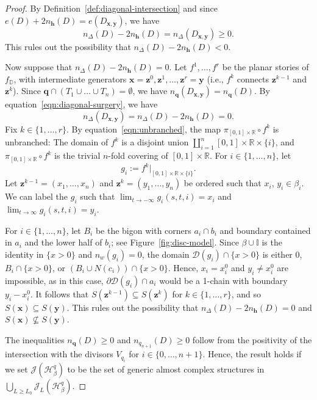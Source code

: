 \documentclass[11pt]{amsart}
\numberwithin{equation}{section}
\numberwithin{figure}{section}
\theoremstyle{definition}
\newcommand{\cD}{\mathcal{D}}
\newcommand{\cH}{\mathcal{H}}
\newcommand{\cJ}{\mathscr{J}}
\newcommand{\bD}{\mathbb{D}}
\newcommand{\bI}{\mathbb{I}}
\newcommand{\bR}{\mathbb{R}}
\newcommand{\hs}{\boldsymbol{h}}
\newcommand{\qs}{\boldsymbol{q}}
\newcommand{\xs}{\boldsymbol{x}}
\newcommand{\ys}{\boldsymbol{y}}
\newcommand{\zs}{\boldsymbol{z}}
\begin{document}
\begin{proof}
    By Definition~\ref{def:diagonal-intersection} and since $e(D) + 2n_{\hs}(D) = e(D_{\xs,\ys})$, we have
    \begin{equation}\label{eqn:diagonal-surgery}
    n_{\Delta}(D) - 2n_{\hs}(D) = n_{\Delta}(D_{\xs,\ys}) \ge 0.
    \end{equation}
    This rules out the possibility that $n_\Delta(D) - 2n_{\hs}(D) < 0$.

    Now suppose that $n_{\Delta}(D) - 2n_{\hs}(D) = 0$. Let $f^1,\dots,f^r$ be the planar stories of $f_{\bD}$, with intermediate generators $\xs = \zs^0, \zs^1, \dots, \zs^r = \ys$ (i.e., $f^k$ connects $\zs^{k-1}$ and $\zs^k$). Since $\qs \cap (T_1 \cup \dots \cup T_n) = \emptyset$, we have $n_{\qs}(D_{\xs,\ys}) = n_{\qs}(D)$. By equation~\eqref{eqn:diagonal-surgery}, we have 
    \begin{equation}\label{eqn:unbranched}
    n_\Delta(D_{\xs,\ys}) = n_\Delta(D) - 2n_{\hs}(D) = 0. 
    \end{equation}
    Fix $k \in \{1,\dots,r\}$. By equation~\eqref{eqn:unbranched}, the map $\pi_{[0,1] \times \bR} \circ f^k$ is unbranched: The domain of $f^k$ is a disjoint union $\coprod_{i=1}^n [0,1] \times \bR \times \{i\}$, and $\pi_{[0,1] \times \bR} \circ f^k$ is the trivial $n$-fold covering of $[0,1] \times \bR$. For $i \in \{1,\dots,n\}$, let
    \[
    g_i := f^k|_{[0,1] \times \bR \times \{i\}}.
    \]
    Let $\zs^{k-1} = (x_1,\dots,x_n)$ and $\zs^k = (y_1,\dots,y_n)$ be ordered such that $x_i$, $y_i \in \beta_i$. We can label the $g_i$ such that $\lim_{t \to -\infty} g_i(s,t,i) = x_i$ and $\lim_{t \to \infty} g_i(s,t,i) = y_i$.

    For $i \in \{1,\dots,n\}$, let $B_i$ be the bigon with corners $a_i \cap b_i$ and boundary contained in $a_i$ and the lower half of $b_i$; see Figure~\ref{fig:disc-model}. Since $\beta \cup \bI$ is the identity in $\{x > 0\}$ and $n_w(g_i) = 0$, the domain $\cD(g_i) \cap \{x>0\}$ is either $0$, $B_i \cap \{x>0\}$, or $(B_i \cup N(c_i)) \cap \{x>0\}$. Hence, $x_i = x_i^0$ and $y_i \neq x_i^0$ are impossible, as in this case, $\partial\cD(g_i) \cap a_i$ would be a 1-chain with boundary $y_i - x_i^0$. It follows that $S(\zs^{k-1}) \subseteq S(\zs^k)$ for $k \in \{1,\dots,r\}$, and so $S(\xs) \subseteq S(\ys)$. This rules out the possibility that $n_{\Delta}(D) - 2n_{\hs}(D) = 0$ and $S(\xs) \nsubseteq S(\ys)$.

    The inequalities $n_{\qs}(D) \ge 0$ and $n_{q_{n+1}}(D) \ge 0$ follow from the positivity of the intersection with the divisors $V_{q_i}$ for $i \in \{0,\dots,n+1\}$. Hence, the result holds if we set $\cJ(\cH^q_\beta)$ to be the set of generic almost complex structures in $\bigcup_{L \ge L_0} \cJ_L(\cH^q_\beta)$.
\end{proof}
\end{document}
